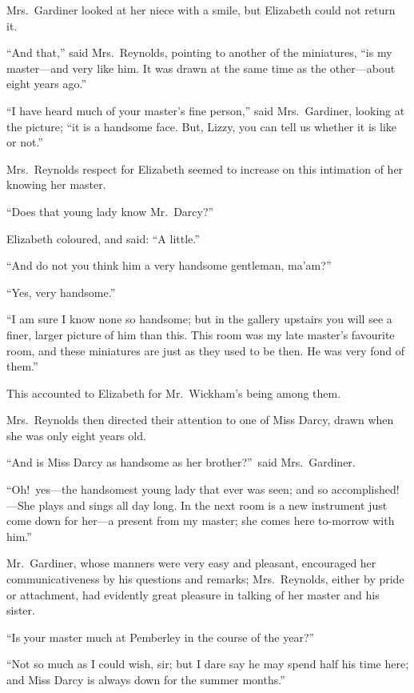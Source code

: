 \documentclass[12pt,english,oneside]{book}
\begin{document}
Mrs.\ Gardiner looked at her niece with a smile, but Elizabeth could
not return it.

{}``And that,'' said Mrs.\ Reynolds, pointing to another of the
miniatures, {}``is my master\mbox{---}and very like him. It was
drawn at the same time as the other\mbox{---}about eight years ago.''

{}``I have heard much of your master's fine person,'' said Mrs.\
Gardiner, looking at the picture; {}``it is a handsome face. But,
Lizzy, you can tell us whether it is like or not.''

Mrs.\ Reynolds respect for Elizabeth seemed to increase on this intimation
of her knowing her master.

{}``Does that young lady know Mr.\ Darcy?''\ 

Elizabeth coloured, and said: {}``A little.''

{}``And do not you think him a very handsome gentleman, ma'am?''\ 

{}``Yes, very handsome.''

{}``I am sure I know none so handsome; but in the gallery upstairs
you will see a finer, larger picture of him than this. This room was
my late master's favourite room, and these miniatures are just as
they used to be then. He was very fond of them.''

This accounted to Elizabeth for Mr.\ Wickham's being among them.

Mrs.\ Reynolds then directed their attention to one of Miss Darcy,
drawn when she was only eight years old.

{}``And is Miss Darcy as handsome as her brother?''\ said Mrs.\ Gardiner.

{}``Oh!\ yes\mbox{---}the handsomest young lady that ever was seen;
and so accomplished!\mbox{---}She plays and sings all day long. In
the next room is a new instrument just come down for her\mbox{---}a
present from my master; she comes here to-morrow with him.''

Mr.\ Gardiner, whose manners were very easy and pleasant, encouraged
her communicativeness by his questions and remarks; Mrs.\ Reynolds,
either by pride or attachment, had evidently great pleasure in talking
of her master and his sister.

{}``Is your master much at Pemberley in the course of the year?''\ 

{}``Not so much as I could wish, sir; but I dare say he may spend
half his time here; and Miss Darcy is always down for the summer months.''
\end{document}
